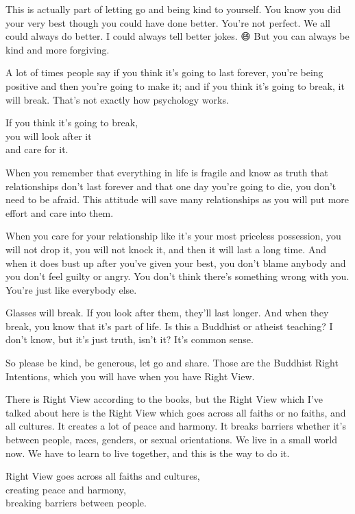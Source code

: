 \documentclass[12pt, openany]{book}
\newenvironment{aphorism}%
{%
\begin{center}\begin{itshape}
}%
{\end{itshape}\end{center}
}%
\begin{document}
This is actually part of letting go and being kind to yourself. You know you did your very best though you could have done better. You’re not perfect. We all could always do better. I could always tell better jokes. 😄 But you can always be kind and more forgiving. 

A lot of times people say if you think it’s going to last forever, you’re being positive and then you’re going to make it; and if you think it’s going to break, it will break. That’s not exactly how psychology works. 

\begin{aphorism}
If you think it’s going to break,\\  
you will look after it\\ 
and care for it.
\end{aphorism}

When you remember that everything in life is fragile and know as truth that relationships don’t last forever and that one day you’re going to die, you don’t need to be afraid. This attitude will save many relationships as you will put more effort and care into them. 

When you care for your relationship like it’s your most priceless possession, you will not drop it, you will not knock it, and then it will last a long time. And when it does bust up after you’ve given your best, you don’t blame anybody and you don’t feel guilty or angry. You don’t think there’s something wrong with you. You’re just like everybody else. 

Glasses will break. If you look after them, they’ll last longer. And when they break, you know that it’s part of life. Is this a Buddhist or atheist teaching? I don’t know, but it’s just truth, isn’t it? It’s common sense. 

So please be kind, be generous, let go and share. Those are the Buddhist Right Intentions, which you will have when you have Right View. 

There is Right View according to the books, but the Right View which I’ve talked about here is the Right View which goes across all faiths or no faiths, and all cultures. It creates a lot of peace and harmony. It breaks barriers whether it’s between people, races, genders, or sexual orientations. We live in a small world now. We have to learn to live together, and this is the way to do it. 

\begin{aphorism}
Right View goes across all faiths and cultures,\\  
creating peace and harmony,\\ 
breaking barriers between people.
\end{aphorism}
\end{document}
